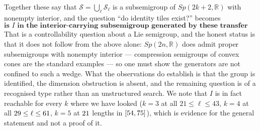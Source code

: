 \documentclass[11pt]{article}
\theoremstyle{definition}
\begin{document}
\noindent
Together these say that $\mathcal S=\bigcup_\ell\mathcal S_\ell$ is a
subsemigroup of $Sp(2k+2,\mathbb R)$ with nonempty interior, and the question
``do identity tiles exist?'' becomes
\[
  \textbf{is }I\textbf{ in the interior-carrying subsemigroup generated by these
  transfer matrices?}
\]
That is a controllability question about a Lie semigroup, and the honest status
is that it does not follow from the above alone: $Sp(2n,\mathbb R)$ does admit
proper subsemigroups with nonempty interior --- compression semigroups of convex
cones are the standard examples --- so one must show the generators are not
confined to such a wedge. What the observations do establish is that the group
is identified, the dimension obstruction is absent, and the remaining question is
of a recognised type rather than an unstructured search. We note that $I$ is in
fact reachable for every $k$ where we have looked ($k=3$ at all
$21\le\ell\le43$, $k=4$ at all $29\le\ell\le61$, $k=5$ at
$21$ lengths in $[54,75]$), which is
evidence for the general statement and not a proof of it.



\end{document}
